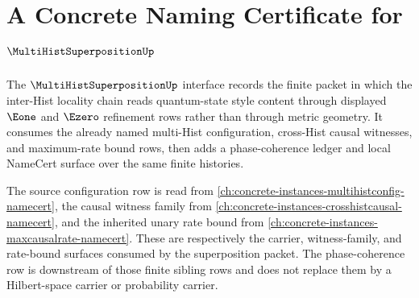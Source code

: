 \chapter{A Concrete Naming Certificate for $\MultiHistSuperpositionUp$}
\label{ch:concrete-instances-multihistsuperposition-namecert}

The $\MultiHistSuperpositionUp$ interface records the finite packet in which the inter-Hist locality chain reads quantum-state style content through displayed $\Eone$ and $\Ezero$ refinement rows rather than through metric geometry. It consumes the already named multi-Hist configuration, cross-Hist causal witnesses, and maximum-rate bound rows, then adds a phase-coherence ledger and local NameCert surface over the same finite histories.

The source configuration row is read from \autoref{ch:concrete-instances-multihistconfig-namecert}, the causal witness family from \autoref{ch:concrete-instances-crosshistcausal-namecert}, and the inherited unary rate bound from \autoref{ch:concrete-instances-maxcausalrate-namecert}. These are respectively the carrier, witness-family, and rate-bound surfaces consumed by the superposition packet. The phase-coherence row is downstream of those finite sibling rows and does not replace them by a Hilbert-space carrier or probability carrier.

